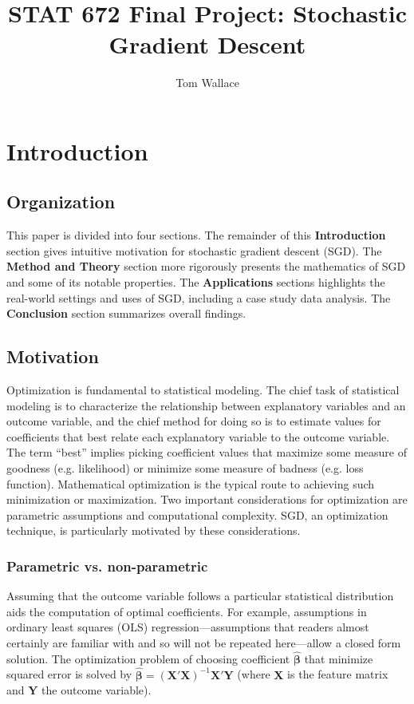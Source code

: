 \documentclass{article}
\author{Tom Wallace}
\title{STAT 672 Final Project: Stochastic Gradient Descent}
\begin{document}
\maketitle

\section{Introduction}

\subsection{Organization}

This paper is divided into four sections. The remainder of this
\textbf{Introduction} section gives intuitive motivation for stochastic gradient
descent (SGD). The \textbf{Method and Theory} section more rigorously presents the
mathematics of SGD and some of its notable properties. The
\textbf{Applications} sections highlights the real-world settings and uses of SGD,
including a case study data analysis. The \textbf{Conclusion} section summarizes
overall findings.

\subsection{Motivation}

Optimization is fundamental to statistical modeling. The chief task of
statistical modeling is to characterize the relationship between 
explanatory variables and an outcome variable, and the chief method for doing so
is to estimate values for coefficients that best relate
each explanatory variable to the outcome variable. The term ``best''
implies picking coefficient values that
maximize some measure of goodness (e.g. likelihood) or minimize some measure of
badness (e.g. loss function). 
Mathematical optimization is the typical
route to achieving such minimization or maximization. Two important
considerations for optimization are parametric assumptions and computational
complexity. SGD, an optimization technique, is
particularly motivated by these considerations.

\subsubsection{Parametric vs. non-parametric}

Assuming that the outcome variable follows a
particular statistical distribution aids the computation of optimal coefficients. 
For example, assumptions in ordinary least squares (OLS)
regression---assumptions that readers almost certainly are familiar with and so will not be
repeated here---allow a closed form solution. The optimization problem of
choosing coefficient $\hat{\bm{\beta}}$ that minimize squared error is solved
by $\hat{\bm{\beta}} = (\bm{X}'\bm{X})^{-1}\bm{X}'\bm{Y}$ (where $\bm{X}$ is the
feature matrix and $\bm{Y}$ the outcome variable).
\end{document}
